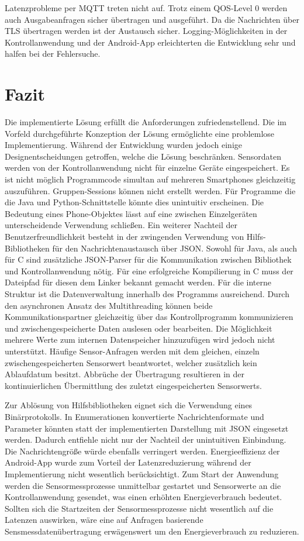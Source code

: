 \documentclass[11pt,a4paper]{report}
\begin{document}
Latenzprobleme per MQTT treten nicht auf.
Trotz einem QOS-Level 0 werden auch Ausgabeanfragen sicher übertragen und ausgeführt.
Da die Nachrichten über TLS übertragen werden ist der Austausch sicher.
Logging-Möglichkeiten in der Kontrollanwendung und der Android-App erleichterten die Entwicklung sehr und halfen bei der Fehlersuche.

\chapter{Fazit}\label{chap:fazit}
Die implementierte Lösung erfüllt die Anforderungen zufriedenstellend.
Die im Vorfeld durchgeführte Konzeption der Lösung ermöglichte eine problemlose Implementierung.
Während der Entwicklung wurden jedoch einige Designentscheidungen getroffen, welche die Lösung beschränken.
Sensordaten werden von der Kontrollanwendung nicht für einzelne Geräte eingespeichert.
Es ist nicht möglich Programmcode simultan auf mehreren Smartphones gleichzeitig auszuführen.
Gruppen-Sessions können nicht erstellt werden.
Für Programme die die Java und Python-Schnittstelle könnte dies unintuitiv erscheinen.
Die Bedeutung eines Phone-Objektes lässt auf eine zwischen Einzelgeräten unterscheidende Verwendung schließen.
Ein weiterer Nachteil der Benutzerfreundlichkeit besteht in der zwingenden Verwendung von Hilfs-Bibliotheken für den Nachrichtenaustausch über JSON.
Sowohl für Java, als auch für C sind zusätzliche JSON-Parser für die Kommunikation zwischen Bibliothek und Kontrollanwendung nötig.
Für eine erfolgreiche Kompilierung in C muss der Dateipfad für diesen dem Linker bekannt gemacht werden.
Für die interne Struktur ist die Datenverwaltung innerhalb des Programms ausreichend.
Durch den asynchronen Ansatz des Multithreading können beide Kommunikationspartner gleichzeitig über das Kontrollprogramm kommunizieren und zwischengespeicherte Daten auslesen oder bearbeiten.
Die Möglichkeit mehrere Werte zum internen Datenspeicher hinzuzufügen wird jedoch nicht unterstützt.
Häufige Sensor-Anfragen werden mit dem gleichen, einzeln zwischengespeicherten Sensorwert beantwortet, welcher zusätzlich kein Ablaufdatum besitzt.
Abbrüche der Übertragung resultieren in der kontinuierlichen Übermittlung des zuletzt eingespeicherten Sensorwerts.

Zur Ablösung von Hilfsbibliotheken eignet sich die Verwendung eines Binärprotokolls.
In Enumerationen konvertierte Nachrichtenformate und Parameter könnten statt der implementierten Darstellung mit JSON eingesetzt werden.
Dadurch entfiehle nicht nur der Nachteil der unintuitiven Einbindung.
Die Nachrichtengröße würde ebenfalls verringert werden.
Energieeffizienz der Android-App wurde zum Vorteil der Latenzreduzierung während der Implementierung nicht wesentlich berücksichtigt.
Zum Start der Anwendung werden die Sensormessprozesse unmittelbar gestartet und Sensorwerte an die Kontrollanwendung gesendet, was einen erhöhten Energieverbrauch bedeutet.
Sollten sich die Startzeiten der Sensormessprozesse nicht wesentlich auf die Latenzen auswirken, wäre eine auf Anfragen basierende Sensmessdatenübertragung erwägenswert um den Energieverbrauch zu reduzieren.
\end{document}
